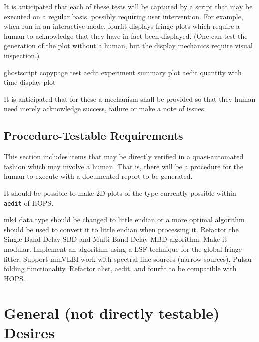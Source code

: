 It is anticipated that each of these tests will be captured by a
script that may be executed on a regular basis, possibly requiring
user intervention.  For example, when run in an interactive mode,
\ac{fourfit} displays fringe plots which require a human to acknowledge
that they have in fact been displayed.  (One can test the generation of
the plot without a human, but the display mechanics require visual
inspection.)

\begin{description}
 \ac{ghostscript} copypage test
 \ac{aedit} experiment summary plot
 \ac{aedit} quantity with time display plot
 \FIXME[more]
\end{description}

It is anticipated that for these a mechanism shall be provided
so that they human need merely acknowledge success, failure or
make a note of issues.

\subsection{Procedure-Testable Requirements}
\label{sec:procedure}

This section includes items that may be directly verified in a quasi-automated
fashion which may involve a human.  That is, there will be a procedure for the
human to execute with a documented report to be generated.

\begin{description}
 It should be possible to make 2D plots of the type
currently possible within \texttt{\ac{aedit}} of \ac{HOPS}.
 \FIXME[more]


\reqid[X] mk4 data type should be changed to little endian or a more
    optimal algorithm should be used to convert it to little endian
    when processing it.
\reqid[X] Refactor the Single Band Delay \ac{SBD}
    and Multi Band Delay \ac{MBD} algorithm. Make it modular.
\reqid[X] Implement an algorithm using a \ac{LSF} %
    technique for the global fringe fitter.
\reqid[X] Support mmVLBI work with spectral line sources (narrow sources).
\reqid[X] Pulsar folding functionality.
\reqid[X] Refactor alist, aedit, and fourfit to be compatible with \ac{HOPS}.

\end{description}

\section{General (not directly testable) Desires}
\label{sec:desires}

